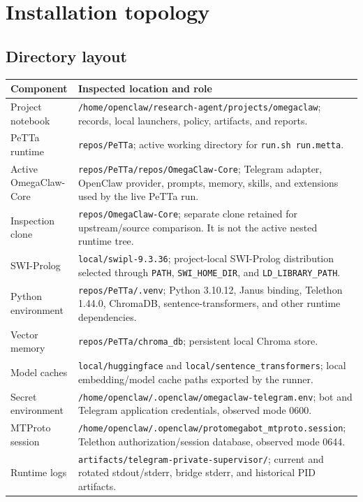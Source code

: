 \documentclass[10pt]{article}
\newcommand{\code}[1]{\texttt{#1}}
\begin{document}
\section{Installation topology}

\subsection{Directory layout}

\begin{longtable}{p{}p{}}
\toprule
Component & Inspected location and role \\
\midrule
\endhead
Project notebook & \code{/home/openclaw/research-agent/projects/omegaclaw}; records, local launchers, policy, artifacts, and reports. \\
PeTTa runtime & \code{repos/PeTTa}; active working directory for \code{run.sh run.metta}. \\
Active OmegaClaw-Core & \code{repos/PeTTa/repos/OmegaClaw-Core}; Telegram adapter, OpenClaw provider, prompts, memory, skills, and extensions used by the live PeTTa run. \\
Inspection clone & \code{repos/OmegaClaw-Core}; separate clone retained for upstream/source comparison. It is not the active nested runtime tree. \\
SWI-Prolog & \code{local/swipl-9.3.36}; project-local SWI-Prolog distribution selected through \code{PATH}, \code{SWI\_HOME\_DIR}, and \code{LD\_LIBRARY\_PATH}. \\
Python environment & \code{repos/PeTTa/.venv}; Python 3.10.12, Janus binding, Telethon 1.44.0, ChromaDB, sentence-transformers, and other runtime dependencies. \\
Vector memory & \code{repos/PeTTa/chroma\_db}; persistent local Chroma store. \\
Model caches & \code{local/huggingface} and \code{local/sentence\_transformers}; local embedding/model cache paths exported by the runner. \\
Secret environment & \code{/home/openclaw/.openclaw/omegaclaw-telegram.env}; bot and Telegram application credentials, observed mode 0600. \\
MTProto session & \code{/home/openclaw/.openclaw/protomegabot\_mtproto.session}; Telethon authorization/session database, observed mode 0644. \\
Runtime logs & \code{artifacts/telegram-private-supervisor/}; current and rotated stdout/stderr, bridge stderr, and historical PID artifacts. \\
\bottomrule
\end{longtable}
\end{document}
